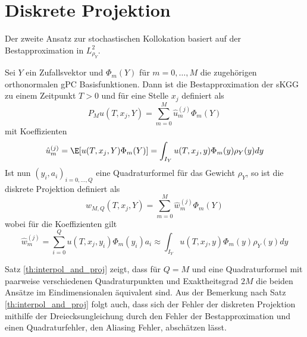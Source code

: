 \section{Diskrete Projektion}
\label{sec:discrete_proj}
Der zweite Ansatz zur stochastischen Kollokation basiert auf der Bestapproximation in $L_{\rho_Y}^2$.
\begin{mathdef}
Sei $Y$ ein Zufallsvektor und $\Phi_m(Y)$ für $m=0,\dots,M$ die zugehörigen orthonormalen gPC Basisfunktionen. Dann ist die Bestapproximation der sKGG zu einem Zeitpunkt $T>0$ und für eine Stelle $x_j$ definiert als
\[P_Mu(T,x_j,Y)=\sum_{m=0}^M\hat{u}_m^{(j)}\Phi_m(Y)\]
mit Koeffizienten
\[\hat{u}_m^{(j)}=\E[u(T,x_j,Y)\Phi_m(Y)]=\int_{I_Y} u(T,x_j,y)\Phi_m(y)\rho_Y(y)dy\]
Ist nun $(y_i,a_i)_{i=0,\dots,Q}$ eine Quadraturformel für das Gewicht $\rho_Y$, so ist die diskrete Projektion definiert als
\[w_{M,Q}(T,x_j,Y)=\sum_{m=0}^M\hat{w}_m^{(j)}\Phi_m(Y)\] wobei für die Koeffizienten gilt
\[\hat{w}_m^{(j)}=\sum_{i=0}^Qu(T,x_j,y_i)\Phi_m(y_i)a_i\approx \int_{I_Y} u(T,x_j,y)\Phi_m(y)\rho_Y(y)dy\]
\end{mathdef}
Satz \ref{th:interpol_and_proj} zeigt, dass für $Q=M$ und eine Quadraturformel mit paarweise verschiedenen Quadraturpunkten und Exaktheitsgrad $2M$ die beiden Ansätze im Eindimensionalen äquivalent sind. Aus der Bemerkung nach Satz \ref{th:interpol_and_proj} folgt auch, dass sich der Fehler der diskreten Projektion mithilfe der Dreiecksungleichung durch den Fehler der Bestapproximation und einen Quadraturfehler, den Aliasing Fehler, abschätzen lässt.

